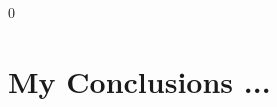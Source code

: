0\def\baselinestretch{1}
\chapter{My Conclusions ...}
\ifpdf
    \graphicspath{{Conclusions/ConclusionsFigs/PNG/}{Conclusions/ConclusionsFigs/PDF/}{Conclusions/ConclusionsFigs/}}
\else
    \graphicspath{{Conclusions/ConclusionsFigs/EPS/}{Conclusions/ConclusionsFigs/}}
\fi

\def\baselinestretch{1.66}




%




